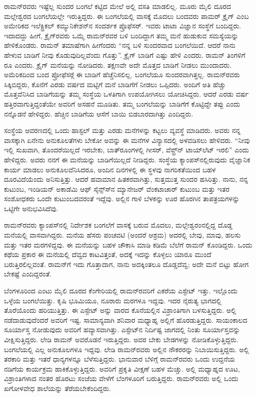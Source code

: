 ರಾಮನ್‍ರವರು ಇಷ್ಟೆಲ್ಲ ಸುಂದರ ಬಂಗಲೆ ಕಟ್ಟಿದ ಮೇಲೆ ಅಲ್ಲಿ ವಸತಿ ಮಾಡಲಿಲ್ಲ. ಮೂರು ಮೈಲಿ ದೂರದ ಮಲ್ಲೇಶ್ವರದ ಬಂಗಲೆಯಲ್ಲೇ ಇರುತ್ತಿದ್ದರು. ಈ ಬಂಗಲೆಯಲ್ಲಿ ವಾಸಕ್ಕೆ ಮೊದಲು ಬಂದವರು ಪಾಮರ್ ಕ್ರೈಗ್ ಎಂಬ ಅಮೇರಿಕದ ಇಲೆಕ್ಟ್ರಿಕಲ್ ಕಮ್ಯುನಿಕೇಶನ್‍ನ ಸಂದರ್ಶಕ ಪ್ರೊಫೆಸರ್. ಇವರು ಟಾಟಾ ವಿಜ್ಞಾನ ಸಂಸ್ಥೆಗೆ ಬಂದಿದ್ದರು. ಇದಾದದ್ದು ಹೀಗೆ, ಕ್ರೈಗ್‍ರವರು ಒಮ್ಮೆ ರಾಮನ್‍ರವರ ಬಳಿ ಬಂದಿದ್ದಾಗ ತಮ್ಮ ಮನೆ ಹುಡುಕುವ ಸಮಸ್ಯೆಯನ್ನು ಹೇಳಿಕೊಂಡರು. ರಾಮನ್ ತಮಾಷೆಗಾಗಿ ಹೀಗೆಂದರು “ನನ್ನ ಬಳಿ ಸುಂದರವಾದ ಬಂಗಲೆಯಿದೆ. ಆದರೆ ನಾನು ಹೇಳುವ ಬಾಡಿಗೆ ನೀವು ಕೊಡುವುದಿಲ್ಲವೆಂದು ಗೊತ್ತು”. ಕ್ರೈಗ್ ಬಾಡಿಗೆ ಎಷ್ಟು ಹೇಳಿ ಎಂದರು. ರಾಮನ್ ತಿಂಗಳಿಗೆ  ರೂ ಎಂದರು. ಕ್ರೈಗ್ ಮನೆಯನ್ನು ನೋಡಿದರು. ತಕ್ಷಣವೇ ಅದೇ ಮೊತ್ತದ ಬಾಡಿಗೆ ನೀಡಲು ಮುಂದಾದರು. ಅಮೆರಿಕದಿಂದ ಬಂದ ಪ್ರೋಫೆಸರ್‍ಗೆ ಈ ಬಾಡಿಗೆ ಹೆಚ್ಚೆನಿಸಲಿಲ್ಲ. ಬಂಗಲೆಯೂ ಸುಂದರವಾಗಿತ್ತಲ್ಲ. ರಾಮನ್‍ರವರು ಸಿಕ್ಕಿಬಿದ್ದರು, ಕೊನೆಗೆ ಎರಡು ವರ್ಷದ ಮಟ್ಟಿಗೆ ಮನೆ ಬಾಡಿಗೆಗೆ ನೀಡಲು ಒಪ್ಪಿದರು. ಅಂದಿಗೆ ಅತಿ ಹೆಚ್ಚು ಮೊತ್ತವೆನಿಸಿದ ಬಾಡಿಗೆಯನ್ನು ತಮ್ಮ ಸಂಸ್ಥೆಯ ಒಳತಿಗಾಗಿ ಉಪಯೋಗಿಸಲು ಯೋಚಿಸಿದ್ದರು. ಆದರೆ ಎರಡು ವರ್ಷ ಹತ್ತಿರವಾಗುತ್ತಿದ್ದಂತೆಯೇ ಅವರಿಗೆ ಅಸಹನೆ ಮೂಡಿತು. ತಮ್ಮ ಬಂಗಲೆಯನ್ನು ಬಾಡಿಗೆಗೆ ಕೊಟ್ಟಿದ್ದೇ ತಪ್ಪು ಎಂದು ನನ್ನೊಡನೆ ಹೇಳಿದ್ದರು. ಹೆಚ್ಚಿನ ಬಾಡಿಗೆಯ ಆಸೆಗೆ ಬಾಯಿ ಬಿಡಬಾರದಾಗಿತ್ತು ಎಂದಿದ್ದರು.

ಸಂಸ್ಥೆಯ ಆವರಣದಲ್ಲಿ ಒಂದು ಹಾಸ್ಟಲ್ ಮತ್ತು ಎರಡು ಮನೆಗಳನ್ನು ಕಟ್ಟಲು ವ್ಯವಸ್ಥೆ ಮಾಡಿದರು. ಅವರು ನನ್ನ ವಾಸಕ್ಕಾಗಿ ಏನೇನು ಅನುಕೂಲತೆಗಳು ಬೇಕೋ ಅವನ್ನು ಈ ಮನೆಗಳ ವಿನ್ಯಾಸದಲ್ಲಿ ಅಳವಡಿಸಲು ಹೇಳಿದರು. “ನೀವು ಇಲ್ಲಿ ಸುಖವಾಗಿ, ತೊಂದರೆಯಿಲ್ಲದೆ ಇರಬೇಕು, ಬಾತ್‍ರೂಂಗಳಲ್ಲಿ ಗೀಸರ್, ವೆಸ್ಟ್ರ್‌ನ್ ಟಾಯ್‍ಲೆಟ್ ಇರಲಿ” ಎಂದು ಹೇಳಿದ್ದರು. ಅವರು ನನಗೆ ಈ ಮನೆಯನ್ನು ಬಾಡಿಗೆಯಿಲ್ಲದೆ ನೀಡಿದ್ದರು. ಸಂಸ್ಥೆಯ ಕ್ಯಾಂಪಸ್‍ನಲ್ಲಿರುವುದು ವೈಜ್ಞಾನಿಕ ಕಾರ್ಯ ಮಾಡಲು ಅನುಕೂಲವೆನಿಸಿದರೂ, ಅಂದಿನ ದಿನಗಳಲ್ಲಿ ಈ ಸ್ಥಳವು ನಾಗರಿಕತೆಯಿಂದ ಬಹಳ ದೂರವಿದೆಯೆಂದು ಅನಿಸುತ್ತಿತ್ತು. ಆದರೆ ಹವಾಮಾನ ಹಿತಕರವಾಗಿತ್ತು, ಸುತ್ತಮುತ್ತ ಸುಂದರ ಹಸಿರಿತ್ತು. ನಾನು, ನನ್ನ ಕುಟುಂಬ, ಇಂಡಿಯನ್ ಅಕಾಡೆಮಿ ಆಫ್ ಸೈನ್ಸ್‌ಸ್‍ನ ಮ್ಯಾನೇಜರ್ ವೆಂಕಟಾಚಾರ್ ಕುಟುಂಬ ಮತ್ತು ಇತರ ಸಂಶೋಧಕರು ಒಂದೇ ಕುಟುಂಬದವರಂತೆ ಇದ್ದೆವು. ಅಲ್ಲಿನ ಗಾಳಿ ಬೆಳಕನ್ನು ಊರ ಹೊರಗಿನ ತಾಪತ್ರಯಗಳನ್ನು ಒಟ್ಟಿಗೇ ಅನುಭವಿಸಿದೆವು.

ರಾಮನ್‍ರವರು ಕ್ಯಾಂಪಸ್‍ನಲ್ಲಿ ನಿರ್ದೇಶಕ ಬಂಗಲೆಗೆ ವಾಸಕ್ಕೆ ಬರುವ ಮೊದಲು, ಮಲ್ಲೇಶ್ವರಂನಲ್ಲಿದ್ದ ದೊಡ್ಡ ಮನೆಯಲ್ಲಿ ವಾಸವಾಗಿದ್ದರು. ಮನೆಯ ಹೆಸರು ಪಂಚವಟಿ (ಅಂದರೆ ಆಶ್ರಮ) ಅದರಲ್ಲಿ ಬೇವು, ಮಾವು, ಹಲಸು ಮತ್ತು ಇತರ ಮರಗಳಿದ್ದವು. ಈ ಮನೆಯನ್ನು ಬಹಳ ಚೌಕಾಸಿ ಮಾಡಿ ಕಡಿಮೆ ಬೆಲೆಗೆ ರಾಮನ್ ಕೊಂಡಿದ್ದರು. ಒಂದು ಕಥೆಯ ಪ್ರಕಾರ ಈ ಮನೆಯಲ್ಲಿ ದೆವ್ವದ ಕಾಟವಿತ್ತಂತೆ, ಅದಕ್ಕೆ ಇದನ್ನು ಕೊಳ್ಳಲು ಯಾರೂ ಮುಂದೆ ಬರುತ್ತಿರಲಿಲ್ಲವಂತೆ. ರಾಮನ್‍ಗೆ ಇದು ಗೊತ್ತಾದಾಗ, ನಾನು ಅದಕ್ಕಿಂತಲೂ ದೊಡ್ಡದೆವ್ವ; ಅದೇ ಮನೆ ಬಿಟ್ಟು ಹೋಗ ಬೇಕಷ್ಟೆ ಎಂದಿದ್ದರಂತೆ.

ಬೆಂಗಳೂರಿಂದ ಎಂಟು ಮೈಲಿ ದೂರದ ಕೆಂಗೇರಿಯಲ್ಲಿ ರಾಮನ್‍ರವರಿಗೆ  ಎಕರೆಯ ಎಸ್ಟೇಟ್ ಇತ್ತು. ಇಲ್ಲೊಂದು ಒಳ್ಳೆಯ ಬಂಗಲೆಯಿತ್ತು. ಕೃಷಿ ಭೂಮಿಯೂ, ನೂರಾರು ಮರಗಳೂ ಇದ್ದವು. ಇದರ ನೈರುತ್ಯ ಭಾಗದಲ್ಲಿ ತೊರೆಯೊಂದು ಹರಿಯುತ್ತಿತ್ತು. ಈ ಎಸ್ಟೇಟ್ ಅನ್ನು ವಾರದ ಕೊನೆಯಲ್ಲಿನ ವಿಶ್ರಾಂತಿಗಾಗಿ ಬಳಸುತ್ತಿದ್ದರು. ಅಲ್ಲಿ ನಡೆದಾಡುವುದೆಂದರೆ ಅವರಿಗೆ ಇಷ್ಟ. ಸಾಮಾನ್ಯವಾಗಿ ಶನಿವಾರ ಮಧ್ಯಾಹ್ನ ಅಲ್ಲಿಗೆ ಹೊರಡುತ್ತಿದ್ದರು. ಸಾಯಂಕಾಲದ ಸೂರ್ಯಾಸ್ತ ನೋಡುವುದು ಅವರಿಗೆ ಹವ್ಯಾಸವಾಗಿತ್ತು. ಎಸ್ಟೇಟ್‍ನ ನಿರ್ದಿಷ್ಟ ಜಾಗದಲ್ಲಿ ನಿಂತು ಸೂರ್ಯಾಸ್ತವನ್ನು ವೀಕ್ಷಿಸುತ್ತಿದ್ದರು. ಲೇಡಿ ರಾಮನ್ ಅವರೊಡನೆ ಇರುತ್ತಿದ್ದರು. ಅವರ ಬೇಕು ಬೇಡಗಳನ್ನು ನೋಡಿಕೊಳ್ಳುತ್ತಿದ್ದರು. ಬಂಗಲೆಯಲ್ಲಿ ಎಲ್ಲ ಅನುಕೂಲಗಳೂ ಇದ್ದವು. ಲೇಡಿ ರಾಮನ್‍ರವರು ಅಲ್ಲಿನ ನೌಕರರನ್ನು ನಿಬಾಯಿಸುತ್ತಿದ್ದರು. ಅಲ್ಲಿ ತರಕಾರಿ ಮತ್ತು ಇತರೆ ಧಾನ್ಯಗಳನ್ನೂ ಬೆಳೆಸುತ್ತಿದ್ದರು. ಭಾನುವಾರ ಬೆಳಿಗ್ಗೆ ರಾಮನ್‍ರವರು ಒಂದು ಉದ್ದನೆಯ ನಡಿಗೆಯ ಕಾರ್ಯಕ್ರಮ ಹಾಕಿಕೊಳ್ಳುತ್ತಿದ್ದರು. ಅವರಿಗೆ ಪ್ರಕೃತಿ ವೀಕ್ಷಣೆ ಬಹಳ ಮೆಚ್ಚು. ಅಲ್ಲಿ ಮಧ್ಯಾಹ್ನದ ಊಟ, ವಿಶ್ರಾಂತಿಗಳಾದ ನಂತರ ಹೊರಟು ಸಂಜೆಯ ವೇಳೆಗೆ ಬೆಂಗಳೂರಿಗೆ ಬರುತ್ತಿದ್ದರು. ರಾಮನ್‍ರವರು ಅಲ್ಲಿ ಒಂದು ಖಗೋಳವೇಧ ಶಾಲೆಯನ್ನು ತೆರೆಯಬೇಕೆಂದಿದ್ದರು.


